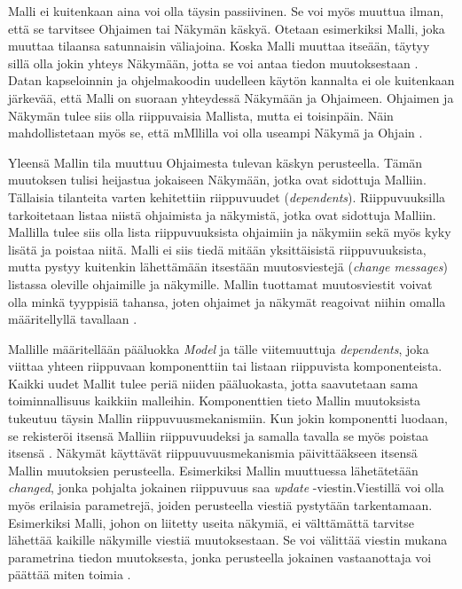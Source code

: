 \documentclass[utf8]{gradu3}
\begin{document}
Malli ei kuitenkaan aina voi olla täysin passiivinen. Se voi myös muuttua ilman, että se tarvitsee Ohjaimen tai Näkymän käskyä. Otetaan esimerkiksi Malli, joka muuttaa tilaansa satunnaisin väliajoina. Koska Malli muuttaa itseään, täytyy sillä olla jokin yhteys Näkymään, jotta se voi antaa tiedon muutoksestaan \parencite{burbeck}. Datan kapseloinnin ja ohjelmakoodin uudelleen käytön kannalta ei ole kuitenkaan järkevää, että Malli on suoraan yhteydessä Näkymään ja Ohjaimeen. Ohjaimen ja Näkymän tulee siis olla riippuvaisia Mallista, mutta ei toisinpäin. Näin mahdollistetaan myös se, että mMllilla voi olla useampi Näkymä ja Ohjain \parencite[s. 4]{krasner_desc}.

Yleensä Mallin tila muuttuu Ohjaimesta tulevan käskyn perusteella. Tämän muutoksen tulisi heijastua jokaiseen Näkymään, jotka ovat sidottuja Malliin. Tällaisia tilanteita varten kehitettiin riippuvuudet (\emph{dependents}).
Riippuvuuksilla tarkoitetaan listaa niistä ohjaimista ja näkymistä, jotka ovat sidottuja Malliin. Mallilla tulee siis olla lista riippuvuuksista ohjaimiin ja näkymiin sekä myös kyky lisätä ja poistaa niitä. Malli ei siis tiedä mitään yksittäisistä riippuvuuksista, mutta pystyy kuitenkin lähettämään itsestään muutosviestejä (\emph{change messages}) listassa oleville ohjaimille ja näkymille. Mallin tuottamat muutosviestit voivat olla minkä tyyppisiä tahansa, joten ohjaimet ja näkymät reagoivat niihin omalla määritellyllä tavallaan  \parencite[s.2-3]{krasner}.

Mallille määritellään pääluokka \emph{Model} ja tälle viitemuuttuja \emph{dependents}, joka viittaa yhteen riippuvaan komponenttiin tai listaan riippuvista komponenteista. Kaikki uudet Mallit tulee periä niiden pääluokasta, jotta saavutetaan sama toiminnallisuus kaikkiin malleihin. Komponenttien tieto Mallin muutoksista tukeutuu täysin Mallin riippuvuusmekanismiin. Kun jokin komponentti luodaan, se rekisteröi itsensä Malliin riippuvuudeksi ja samalla tavalla se myös poistaa itsensä \parencite{burbeck}. Näkymät käyttävät riippuuvuusmekanismia päivittääkseen itsensä Mallin muutoksien perusteella. Esimerkiksi Mallin muuttuessa lähetätetään \textit{changed}, jonka pohjalta jokainen riippuvuus saa \textit{update} -viestin.Viestillä voi olla myös erilaisia parametrejä, joiden perusteella viestiä pystytään tarkentamaan. Esimerkiksi Malli, johon on liitetty useita näkymiä, ei välttämättä tarvitse lähettää kaikille näkymille viestiä muutoksestaan. Se voi välittää viestin mukana parametrina tiedon muutoksesta, jonka perusteella jokainen vastaanottaja voi päättää miten toimia \parencite{burbeck}.
\end{document}

